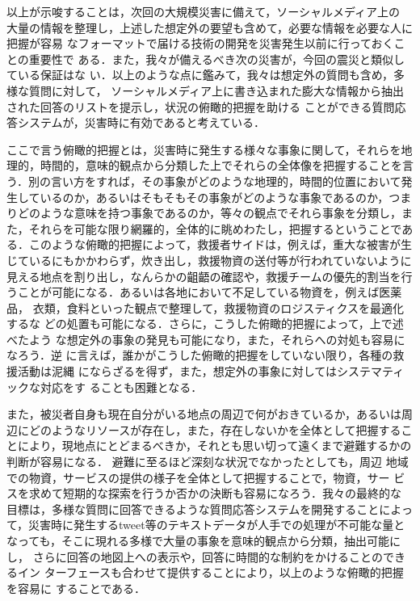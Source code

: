\documentclass[japanese]{jnlp_1.4}
\begin{document}
以上が示唆することは，次回の大規模災害に備えて，ソーシャルメディア上の
大量の情報を整理し，上述した想定外の要望も含めて，必要な情報を必要な人に把握が容易
なフォーマットで届ける技術の開発を災害発生以前に行っておくことの重要性で
ある．また，我々が備えるべき次の災害が，今回の震災と類似している保証はな
い．以上のような点に鑑みて，我々は想定外の質問も含め，多様な質問に対して，
ソーシャルメディア上に書き込まれた膨大な情報から抽出された回答のリストを提示し，状況の俯瞰的把握を助ける
ことができる質問応答システムが，災害時に有効であると考えている．

ここで言う俯瞰的把握とは，災害時に発生する様々な事象に関して，それらを地
理的，時間的，意味的観点から分類した上でそれらの全体像を把握することを言
う．別の言い方をすれば，その事象がどのような地理的，時間的位置において発
生しているのか，あるいはそもそもその事象がどのような事象であるのか，つま
りどのような意味を持つ事象であるのか，等々の観点でそれら事象を分類し，ま
た，それらを可能な限り網羅的，全体的に眺めわたし，把握するということであ
る．このような俯瞰的把握によって，救援者サイドは，例えば，重大な被害が生
じているにもかかわらず，炊き出し，救援物資の送付等が行われていないように
見える地点を割り出し，なんらかの齟齬の確認や，救援チームの優先的割当を行
うことが可能になる．あるいは各地において不足している物資を，例えば医薬品，
衣類，食料といった観点で整理して，救援物資のロジスティクスを最適化するな
どの処置も可能になる．さらに，こうした俯瞰的把握によって，上で述べたよう
な想定外の事象の発見も可能になり，また，それらへの対処も容易になろう．逆
に言えば，誰かがこうした俯瞰的把握をしていない限り，各種の救援活動は泥縄
にならざるを得ず，また，想定外の事象に対してはシステマティックな対応をす
ることも困難となる．

また，被災者自身も現在自分がいる地点の周辺で何がおきているか，あるいは周
辺にどのようなリソースが存在し，また，存在しないかを全体として把握するこ
とにより，現地点にとどまるべきか，それとも思い切って遠くまで避難するかの
判断が容易になる．
避難に至るほど深刻な状況でなかったとしても，周辺
地域での物資，サービスの提供の様子を全体として把握することで，物資，サー
ビスを求めて短期的な探索を行うか否かの決断も容易になろう．我々の最終的な
目標は，多様な質問に回答できるような質問応答システムを開発することによっ
て，災害時に発生するtweet等のテキストデータが人手での処理が不可能な量と
なっても，そこに現れる多様で大量の事象を意味的観点から分類，抽出可能にし，
さらに回答の地図上への表示や，回答に時間的な制約をかけることのできるイン
ターフェースも合わせて提供することにより，以上のような俯瞰的把握を容易に
することである．
\end{document}
